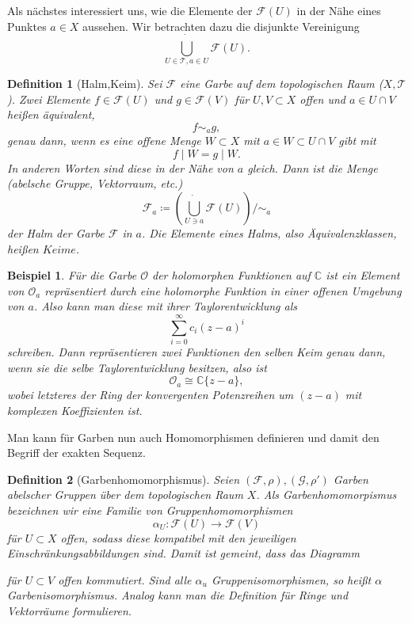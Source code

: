 \documentclass[11pt,a4paper,toc=bibliography]{scrartcl}
\theoremstyle{thm}
\theoremstyle{def}
\newtheorem{defi}{Definition}[section]
\newtheorem{bsp}{Beispiel}[section]
\theoremstyle{remark}
\begin{document}
Als nächstes interessiert uns, wie die Elemente der $\mathcal{F}(U)$ in der Nähe eines Punktes $a\in X$ aussehen. Wir betrachten dazu die disjunkte Vereinigung
\[
\dot{\bigcup_{U\in \mathcal{T},a\in U}} \mathcal{F}(U).
\]

\begin{defi}[Halm,Keim]
Sei $\mathcal{F}$ eine Garbe auf dem topologischen Raum ($X,\mathcal{T}$). Zwei Elemente $f\in\mathcal{F}(U)$ und $g\in \mathcal{F}(V)$ für $U,V\subset X$ offen und $a\in U\cap V$ heißen äquivalent,
\[
f\sim_a g,
\]
genau dann, wenn es eine offene Menge $W\subset X$ mit $a\in W\subset U\cap V$ gibt mit
\[
f\mid W = g\mid W.
\]
In anderen Worten sind diese in der Nähe von $a$ gleich. Dann ist die Menge (abelsche Gruppe, Vektorraum, etc.)
\[
\mathcal{F}_a \coloneqq \left( \dot{\bigcup_{U\ni a}} \mathcal{F}(U) \right) /\sim_a
\]
der \emph{Halm} der Garbe $\mathcal{F}$ in $a$. Die Elemente eines Halms, also Äquivalenzklassen, heißen $Keime$.
\end{defi}

\begin{bsp}
Für die Garbe $\mathcal{O}$ der holomorphen Funktionen auf $\mathbb{C}$ ist ein Element von $\mathcal{O}_a$ repräsentiert durch eine holomorphe Funktion in einer offenen Umgebung von $a$. Also kann man diese mit ihrer Taylorentwicklung als
\[
\sum_{i=0}^{\infty} c_i(z-a)^i
\]
schreiben. Dann repräsentieren zwei Funktionen den selben Keim genau dann, wenn sie die selbe Taylorentwicklung besitzen, also ist 
\[
\mathcal{O}_a \cong \mathbb{C}\{ z-a \},
\]
wobei letzteres der Ring der konvergenten Potenzreihen um $(z-a)$ mit komplexen Koeffizienten ist.
\end{bsp}

Man kann für Garben nun auch Homomorphismen definieren und damit den Begriff der exakten Sequenz.

\begin{defi}[Garbenhomomorphismus]
Seien $(\mathcal{F},\rho),(\mathcal{G},\rho')$ Garben abelscher Gruppen über dem topologischen Raum $X$. 
Als \emph{Garbenhomomorpismus} bezeichnen wir eine Familie von Gruppenhomomorphismen 
\[
\alpha_U :\mathcal{F}(U)\rightarrow \mathcal{F}(V)
\]
für $U\subset X$ offen, sodass diese kompatibel mit den jeweiligen Einschränkungsabbildungen sind. 
Damit ist gemeint, dass das Diagramm
\begin{center}
\end{center}
für $U\subset V$ offen kommutiert. 
Sind alle $\alpha_u$ Gruppenisomorphismen, so heißt $\alpha$ \emph{Garbenisomorphismus}. 
Analog kann man die Definition für Ringe und Vektorräume formulieren.
\end{defi}
\end{document}
